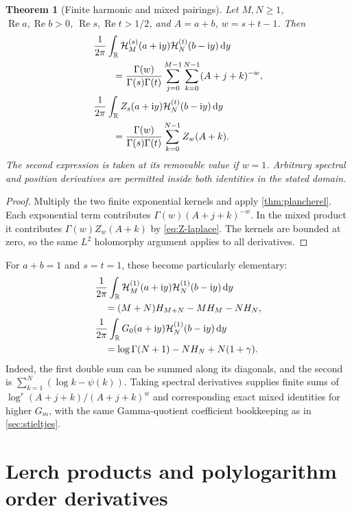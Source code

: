 \documentclass[11pt,a4paper]{article}
\newtheorem{theorem}{Theorem}[section]
\theoremstyle{definition}
\numberwithin{equation}{section}
\newcommand{\R}{\mathbb R}
\newcommand{\Rea}{\operatorname{Re}}
\newcommand{\dd}{\,\mathrm d}
\newcommand{\ii}{\mathrm i}
\begin{document}
\begin{theorem}[Finite harmonic and mixed pairings]\label{thm:harmonic}
Let $M,N\ge1$, $\Rea a,\Rea b>0$, $\Rea s,\Rea t>1/2$, and
$A=a+b$, $w=s+t-1$. Then
\begin{align}
 &\frac1{2\pi}\int_{\R}\mathcal H_M^{(s)}(a+\ii y)
                           \mathcal H_N^{(t)}(b-\ii y)\dd y\notag\\
 &\qquad=\frac{\Gamma(w)}{\Gamma(s)\Gamma(t)}
       \sum_{j=0}^{M-1}\sum_{k=0}^{N-1}(A+j+k)^{-w},\label{eq:HH-pair}\\
 &\frac1{2\pi}\int_{\R}Z_s(a+\ii y)
                           \mathcal H_N^{(t)}(b-\ii y)\dd y\notag\\
 &\qquad=\frac{\Gamma(w)}{\Gamma(s)\Gamma(t)}
                         \sum_{k=0}^{N-1}Z_w(A+k).\label{eq:ZH-pair}
\end{align}
The second expression is taken at its removable value if $w=1$.
Arbitrary spectral and position derivatives are permitted inside both
identities in the stated domain.
\end{theorem}
\begin{proof}
Multiply the two finite exponential kernels and apply
\cref{thm:plancherel}. Each exponential term contributes
$\Gamma(w)(A+j+k)^{-w}$. In the mixed product it contributes
$\Gamma(w)Z_w(A+k)$ by \eqref{eq:Z-laplace}.
The kernels are bounded at zero, so the same $L^2$ holomorphy argument
applies to all derivatives.
\end{proof}

For $a+b=1$ and $s=t=1$, these become particularly elementary:
\begin{align}
 &\frac1{2\pi}\int_{\R}\mathcal H_M^{(1)}(a+\ii y)
                        \mathcal H_N^{(1)}(b-\ii y)\dd y\notag\\
 &\quad=(M+N)H_{M+N}-MH_M-NH_N,\label{eq:HH-elementary}\\
 &\frac1{2\pi}\int_{\R}G_0(a+\ii y)
                        \mathcal H_N^{(1)}(b-\ii y)\dd y\notag\\
 &\quad=\log\Gamma(N+1)-NH_N+N(1+\gamma).
               \label{eq:GH-elementary}
\end{align}
Indeed, the first double sum can be summed along its diagonals, and the
second is $\sum_{k=1}^N(\log k-\psi(k))$.
Taking spectral derivatives supplies finite sums of
$\log^r(A+j+k)/(A+j+k)^w$ and corresponding exact mixed identities for
higher $G_m$, with the same Gamma-quotient coefficient bookkeeping as
in \cref{sec:stieltjes}.

\section{Lerch products and polylogarithm order derivatives}
\label{sec:lerch}
\end{document}
